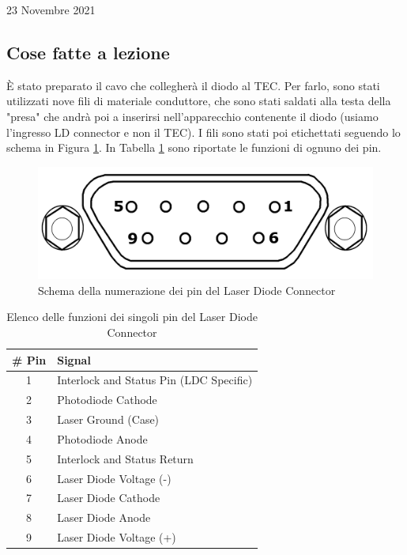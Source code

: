 \documentclass{article}
\numberwithin{equation}{section}
\begin{document}
\begin{section}{23 Novembre 2021}
\subsection{Cose fatte a lezione}
È stato preparato il cavo che collegherà il diodo al TEC. Per farlo, sono stati utilizzati nove fili di materiale conduttore, che sono stati saldati alla testa della "presa" che andrà poi a inserirsi nell'apparecchio contenente il diodo (usiamo l'ingresso LD connector e non il TEC). I fili sono stati poi etichettati seguendo lo schema in Figura \ref{fig:pin}. In Tabella \ref{tab:pinfunction} sono riportate le funzioni di ognuno dei pin. 
\begin{figure}[h]
    \centering
    \includegraphics[scale=0.3]{images/pin_scheme.png}
    \caption{Schema della numerazione dei pin del Laser Diode Connector}
    \label{fig:pin}
\end{figure}

\begin{table}[htpb]
    \centering
    \begin{tabular}{c|l}
        \# Pin &	Signal \\
        \hline
        1 &	Interlock and Status Pin (LDC Specific) \\
        2 &	Photodiode Cathode \\
        3 &	Laser Ground (Case) \\
        4 &	Photodiode Anode \\
        5 &	Interlock and Status Return \\
        6 &	Laser Diode Voltage (-) \\
        7 &	Laser Diode Cathode \\
        8 &	Laser Diode Anode \\
        9 &	Laser Diode Voltage (+)
    \end{tabular}
    \caption{Elenco delle funzioni dei singoli pin del Laser Diode Connector}
    \label{tab:pinfunction}
\end{table}


\end{section}
\end{document}
